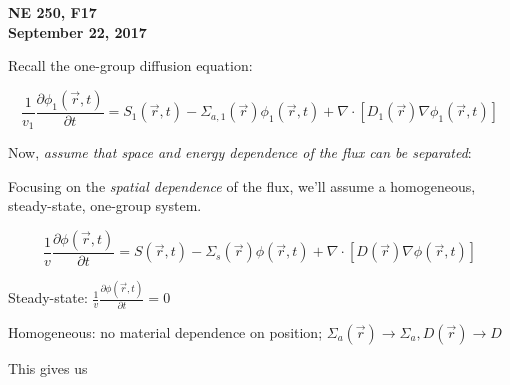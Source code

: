 \documentclass[12pt]{article}
\newif\ifeqns
\newcommand{\rvec}{\ensuremath{\vec{r}}}
\newcommand{\vecr}{\ensuremath{\vec{r}}}
\begin{document}
\begin{center}
{\bf NE 250, F17\\
September 22, 2017 
}
\end{center}

Recall the one-group diffusion equation:

\begin{equation*}
\frac{1}{v_1}\frac{\partial \phi_1(\rvec,t)}{\partial t} = S_1(\rvec,t) - 
\Sigma_{a,1}(\rvec)\phi_1(\rvec,t) + \nabla\cdot[D_1(\rvec)\nabla\phi_1(\rvec,t)]
\end{equation*}

Now, \textit{assume that space and energy dependence of the flux can be separated}:
\ifeqns
\begin{equation*}
\phi(\vecr,E,t) = \phi(\vecr,t)\xi(E), 
\text{ where $\xi(E)$ is the neutron spectrum and $\int_0^{\infty}dE\:\psi(E) = 1$.}
\end{equation*}
\else
\vspace*{3em}
\fi

Focusing on the \textit{spatial dependence} of the flux, we'll assume a homogeneous, steady-state, one-group system.

\begin{equation*}
\frac{1}{v}\frac{\partial\phi(\rvec,t)}{\partial t} = S(\rvec,t) - \Sigma_s(\rvec)\phi(\rvec,t)
+ \nabla\cdot[D(\rvec)\nabla\phi(\rvec,t)]
\end{equation*}

Steady-state: $\frac{1}{v}\frac{\partial\phi(\rvec,t)}{\partial t} = 0$

Homogeneous: no material dependence on position; 
$\Sigma_a(\rvec)\rightarrow\Sigma_a, D(\rvec)\rightarrow D$

This gives us
%
%
%
\ifeqns
\begin{equation*}
\nabla^2\phi(\vecr) - \frac{1}{L^2}\phi(\rvec) = -\frac{S(\rvec)}{D},
\text{ where $L = \sqrt{\frac{D}{\Sigma_a}} =$ diffusion length.}
\end{equation*}
\else
\vspace*{3em}
\fi

\end{document}
